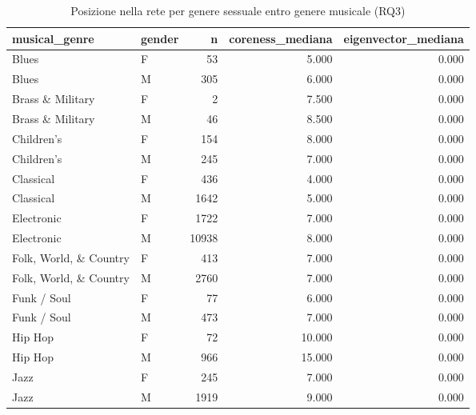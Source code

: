 \begin{table}
\centering
\caption{Posizione nella rete per genere sessuale entro genere musicale (RQ3)}
\label{tab:t3_posizione_per_genere_musicale}
\begin{tabular}{llrrr}
\toprule
         musical\_genre & gender &     n &  coreness\_mediana &  eigenvector\_mediana \\
\midrule
                 Blues &      F &    53 &             5.000 &                0.000 \\
                 Blues &      M &   305 &             6.000 &                0.000 \\
      Brass \& Military &      F &     2 &             7.500 &                0.000 \\
      Brass \& Military &      M &    46 &             8.500 &                0.000 \\
            Children's &      F &   154 &             8.000 &                0.000 \\
            Children's &      M &   245 &             7.000 &                0.000 \\
             Classical &      F &   436 &             4.000 &                0.000 \\
             Classical &      M &  1642 &             5.000 &                0.000 \\
            Electronic &      F &  1722 &             7.000 &                0.000 \\
            Electronic &      M & 10938 &             8.000 &                0.000 \\
Folk, World, \& Country &      F &   413 &             7.000 &                0.000 \\
Folk, World, \& Country &      M &  2760 &             7.000 &                0.000 \\
           Funk / Soul &      F &    77 &             6.000 &                0.000 \\
           Funk / Soul &      M &   473 &             7.000 &                0.000 \\
               Hip Hop &      F &    72 &            10.000 &                0.000 \\
               Hip Hop &      M &   966 &            15.000 &                0.000 \\
                  Jazz &      F &   245 &             7.000 &                0.000 \\
                  Jazz &      M &  1919 &             9.000 &                0.000 \\

\end{tabular}
\end{table}
